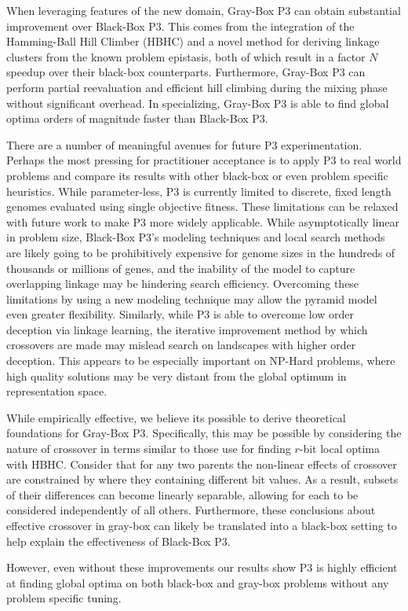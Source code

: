 When leveraging features of the new domain, Gray-Box P3 can obtain substantial improvement
over Black-Box P3. This comes from the integration of the Hamming-Ball Hill Climber (HBHC)
and a novel method for deriving linkage clusters from the known problem epistasis,
both of which result in a factor $N$ speedup over their black-box counterparts.
Furthermore, Gray-Box P3
can perform partial reevaluation and efficient hill climbing during the mixing phase
without significant overhead. In specializing, Gray-Box P3 is able to find
global optima orders of magnitude faster than Black-Box P3.

There are a number of meaningful avenues for future P3 experimentation. Perhaps the most
pressing for practitioner acceptance is to apply P3 to real world problems and compare
its results with other black-box or even problem specific heuristics. While parameter-less,
P3 is currently limited to discrete, fixed length genomes evaluated using single objective
fitness. These limitations can be relaxed with future work to make P3 more widely applicable.
While asymptotically linear in problem size, Black-Box P3's modeling techniques and local search methods are likely going
to be prohibitively expensive for genome sizes in the hundreds of thousands or millions of genes,
and the inability of the model to capture overlapping linkage may be hindering
search efficiency. Overcoming these limitations by using a new modeling technique may allow
the pyramid model even greater flexibility. Similarly, while P3 is able to overcome low
order deception via linkage learning, the iterative improvement method by which crossovers
are made may mislead search on landscapes with higher order deception. This appears
to be especially important on NP-Hard problems, where high quality solutions may be
very distant from the global optimum in representation space.

While empirically effective, we believe its possible to derive theoretical foundations
for Gray-Box P3. Specifically, this may be possible by considering the nature of crossover
in terms similar to those use for finding $r$-bit local optima with HBHC. Consider
that for any two parents the non-linear effects of crossover are constrained by
where they containing different bit values. As a result, subsets of their differences
can become linearly separable, allowing for each to be considered independently of all others.
Furthermore, these conclusions about effective crossover in gray-box can likely be translated
into a black-box setting to help explain the effectiveness of Black-Box P3.

However, even without
these improvements our results show P3 is highly efficient at finding
global optima on both black-box and gray-box problems without any problem specific tuning.
